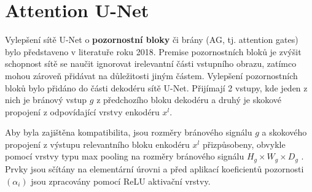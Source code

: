 \section{Attention U-Net}
\label{sec:Chapter24}

Vylepšení sítě U-Net o \textbf{pozornostní bloky} či brány (AG, tj. attention gates) bylo představeno v literatuře \cite{attentionunet} roku 2018. Premise pozornostních bloků je zvýšit schopnost sítě se naučit ignorovat irelevantní části vstupního obrazu, zatímco mohou zároveň přidávat na důležitosti jiným částem. Vylepšení pozornostních bloků bylo přidáno do části dekodéru sítě U-Net. Přijímají 2 vstupy, kde jeden z nich je bránový vstup $g$ z předchozího bloku dekodéru a druhý je skokové propojení z odpovídající vrstvy enkodéru $x^l$. 

Aby byla zajištěna kompatibilita, jsou rozměry bránového signálu $g$ a skokového propojení z výstupu relevantního bloku enkodéru $x^l$ přizpůsobeny, obvykle pomocí vrstvy typu max pooling na rozměry bránového signálu $H_g \times W_g \times D_g$ . Prvky jsou sčítány na elementární úrovni a před aplikací koeficientů pozornosti $(\alpha_i)$ jsou zpracovány pomocí ReLU aktivační vrstvy.

